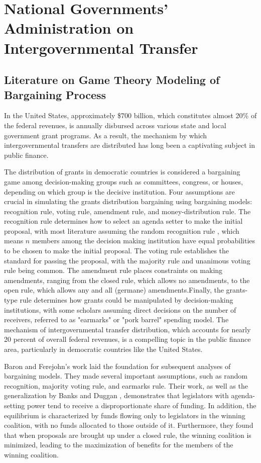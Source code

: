 \chapter{National Governments' Administration on Intergovernmental Transfer}

\section{Literature on Game Theory Modeling of Bargaining Process}
In the United States, approximately \$700 billion, which constitutes almost 20\% of the federal revenues, is annually disbursed across various state and local government grant programs. As a result, the mechanism by which intergovernmental transfers are distributed has long been a captivating subject in public finance.

The distribution of grants in democratic countries is considered a bargaining game among decision-making groups such as committees, congress, or houses, depending on which group is the decisive institution.  Four assumptions are crucial in simulating the grants distribution bargaining using bargaining models: recognition rule, voting rule, amendment rule, and money-distribution rule. The recognition rule determines how to select an agenda setter to make the initial proposal, with most literature assuming the random recognition rule \cite{kalandrakis2004three,anesi2015bargaining,diermeier2011legislative,rosenstiel2021congressional}, which means $n$ members among the decision making institution have equal probabilities to be chosen to make the initial proposal. The voting rule establishes the standard for passing the proposal, with the majority rule and unanimous voting rule being common. The amendment rule places constraints on making amendments, ranging from the closed rule, which allows no amendments, to the open rule, which allows any and all (germane) amendments.Finally, the grants-type rule determines how grants could be manipulated by decision-making institutions, with some scholars assuming direct decisions on the number of receivers, referred to as "earmarks" or "pork barrel" spending model. The mechanism of intergovernmental transfer distribution, which accounts for nearly 20 percent of overall federal revenues, is a compelling topic in the public finance area, particularly in democratic countries like the United States.

Baron and Ferejohn's work \cite{baron1989bargaining} laid the foundation for subsequent analyses of bargaining models. They made several important assumptions, such as random recognition, majority voting rule, and earmarks rule. Their work, as well as the generalization by Banks and Duggan \cite{banks2006general}, demonstrates that legislators with agenda-setting power tend to receive a disproportionate share of funding. In addition, the equilibrium is characterized by funds flowing only to legislators in the winning coalition, with no funds allocated to those outside of it. Furthermore, they found that when proposals are brought up under a closed rule, the winning coalition is minimized, leading to the maximization of benefits for the members of the winning coalition.

